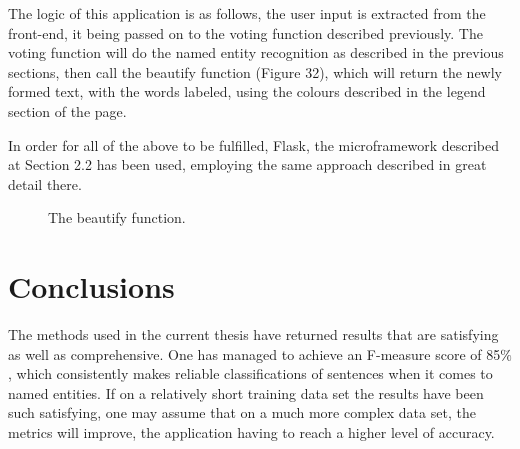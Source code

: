 \documentclass[12pt,a4paper]{article}
\begin{document}
\qquad The logic of this application is as follows, the user input is extracted from the front-end, it being passed on to the voting function described previously. The voting function will do the named entity recognition as described in the previous sections, then call the beautify function (Figure 32), which will return the newly
formed text, with the words labeled, using the colours described in the legend section of the page.

\qquad In order for all of the above to be fulfilled, Flask, the microframework described at Section 2.2 has been used, employing the same approach described in great detail there. 

\begin{figure}[h!]
\begin{center}
\end{center}
\caption{The beautify function.}
\end{figure}
\newpage
\section{Conclusions}
\qquad \quad The methods used in the current thesis have returned results that are satisfying as well as comprehensive. One has managed to achieve an F-measure score of 85$\%$, which consistently makes reliable classifications of sentences when it comes to named entities. If on a relatively short training data set the results have been such satisfying, one may assume that on a much more complex data set, the metrics will improve, the application having to reach a higher level of accuracy.
\end{document}
